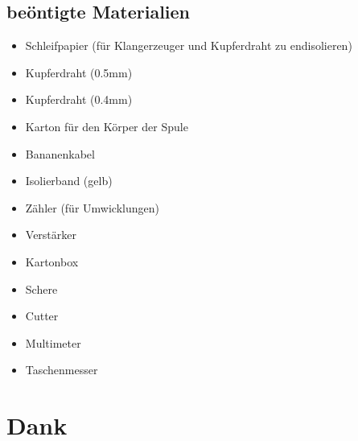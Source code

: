 \documentclass[a4paper,11pt]{report}
\begin{document}
\section{beöntigte Materialien}
\begin{multicols}{2}
    \begin{itemize}[parsep=0pt]
        \item Schleifpapier (für Klangerzeuger und Kupferdraht zu endisolieren)
        \item Kupferdraht (0.5mm)
        \item Kupferdraht (0.4mm)
        \item Karton für den Körper der Spule
        \item Bananenkabel
        \item Isolierband (gelb)
        \item Zähler (für Umwicklungen)
        \item Verstärker
        \item Kartonbox
        \item Schere
        \item Cutter
        \item Multimeter
        \item Taschenmesser
    \end{itemize}
\end{multicols}

\chapter*{Dank}



\newpage
\listoffigures

\newpage


\end{document}
